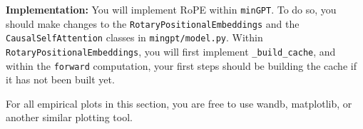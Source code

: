 \documentclass[11pt,addpoints,answers]{exam}
\begin{document}
\begin{questions}
    \textbf{Implementation:}
    You will implement RoPE within \lstinline{minGPT}. To do so, you should make changes to the \lstinline{RotaryPositionalEmbeddings} and the \lstinline{CausalSelfAttention} classes in \lstinline{mingpt/model.py}. Within \lstinline{RotaryPositionalEmbeddings}, you will first implement \lstinline{_build_cache}, and within the \lstinline{forward} computation, your first steps should be building the cache if it has not been built yet.



\clearpage



For all empirical plots in this section, you are free to use wandb, matplotlib, or another similar plotting tool.



\end{questions}
\end{document}
